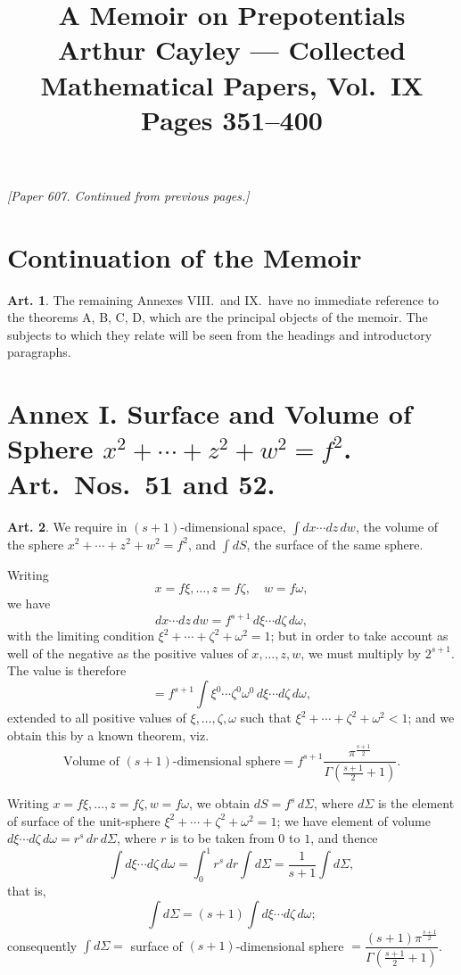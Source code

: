 \documentclass[12pt,a4paper]{article}
\title{\textbf{A Memoir on Prepotentials}\\[6pt]
\large Arthur Cayley --- Collected Mathematical Papers, Vol.~IX\\[4pt]
\normalsize Pages 351--400}
\author{}
\date{}
\theoremstyle{definition}
\newtheorem{art}{Art.}[section]
\begin{document}
\maketitle
\thispagestyle{fancy}

\noindent\textit{[Paper 607. Continued from previous pages.]}

\section*{Continuation of the Memoir}


\newpage
\begin{art}\label{art:50}
The remaining Annexes VIII.\ and IX.\ have no immediate reference to the theorems A, B, C, D, which are the principal objects of the memoir. The subjects to which they relate will be seen from the headings and introductory paragraphs.
\end{art}

\section*{Annex I. Surface and Volume of Sphere $x^2 + \cdots + z^2 + w^2 = f^2$. Art.\ Nos.\ 51 and 52.}

\begin{art}\label{art:51}
We require in $(s+1)$-dimensional space, $\int dx \cdots dz \, dw$, the volume of the sphere $x^2 + \cdots + z^2 + w^2 = f^2$, and $\int dS$, the surface of the same sphere.

Writing
\[
x = f\xi, \ldots, z = f\zeta, \quad w = f\omega,
\]
we have
\[
dx \cdots dz \, dw = f^{s+1} \, d\xi \cdots d\zeta \, d\omega,
\]
with the limiting condition $\xi^2 + \cdots + \zeta^2 + \omega^2 = 1$; but in order to take account as well of the negative as the positive values of $x, \ldots, z, w$, we must multiply by $2^{s+1}$. The value is therefore
\[
= f^{s+1} \int \xi^0 \cdots \zeta^0 \omega^0 \, d\xi \cdots d\zeta \, d\omega,
\]
extended to all positive values of $\xi, \ldots, \zeta, \omega$ such that $\xi^2 + \cdots + \zeta^2 + \omega^2 < 1$; and we obtain this by a known theorem, viz.
\[
\text{Volume of $(s+1)$-dimensional sphere} = f^{s+1} \frac{\pi^{\frac{s+1}{2}}}{\Gamma(\frac{s+1}{2} + 1)}.
\]

Writing $x = f\xi, \ldots, z = f\zeta, w = f\omega$, we obtain $dS = f^s \, d\Sigma$, where $d\Sigma$ is the element of surface of the unit-sphere $\xi^2 + \cdots + \zeta^2 + \omega^2 = 1$; we have element of volume $d\xi \cdots d\zeta \, d\omega = r^s \, dr \, d\Sigma$, where $r$ is to be taken from $0$ to $1$, and thence
\[
\int d\xi \cdots d\zeta \, d\omega = \int_0^1 r^s \, dr \int d\Sigma = \frac{1}{s+1} \int d\Sigma,
\]
that is,
\[
\int d\Sigma = (s+1) \int d\xi \cdots d\zeta \, d\omega;
\]
consequently $\int d\Sigma = $ surface of $(s+1)$-dimensional sphere $= \dfrac{(s+1)\pi^{\frac{s+1}{2}}}{\Gamma(\frac{s+1}{2} + 1)}$.
\end{art}
\end{document}
